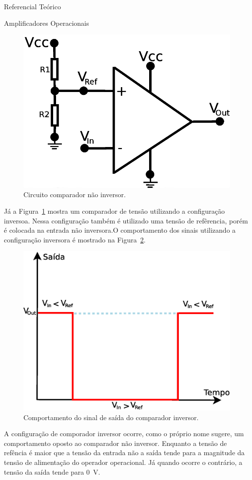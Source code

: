 \begin{chapter}{Referencial Teórico}
\begin{section}{Amplificadores Operacionais}
\begin{figure}[!h]
	\centering
	\begin{minipage}[c]{\textwidth}
	\centering
	\includegraphics[width=0.5\linewidth]{fig/inversor}
	\caption{Circuito comparador não inversor.}
	\label{fig:comparador2}
	\end{minipage}
\end{figure}

Já a Figura~\ref{fig:comparador2} mostra um comparador de tensão utilizando a
configuração inversoa. Nessa configuração também é utilizado uma tensão de
refêrencia, porém é colocada na entrada não inversora.O comportamento dos sinais
utilizando a configuração inversora é mostrado na Figura~\ref{fig:sinal2}. 


\begin{figure}[!h]
	\centering
	\begin{minipage}[c]{\textwidth}
	\centering
	\includegraphics[width=0.5\linewidth]{fig/comparador_inversor}
	\caption{Comportamento do sinal de saída do comparador inversor.}
	\label{fig:sinal2}
	\end{minipage}
\end{figure}

A configuração de comporador inversor ocorre, como o próprio nome sugere, um
comportamento oposto ao comparador não inversor. Enquanto a tensão de refência é
maior que a tensão da entrada não a saída tende para a magnitude da tensão de
alimentação do operador operacional. Já quando ocorre o contrário,  a tensão da
saída tende para 0~V.


\end{section}
\end{chapter}
